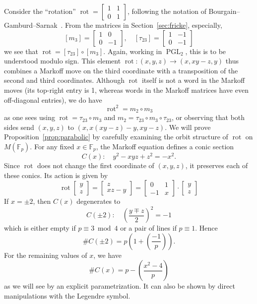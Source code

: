 \documentclass[10pt]{amsart}
\theoremstyle{definition}\newtheorem{defi}[theo]{Definition}\newtheorem{rema}[theo]{Remark}\newtheorem{exam}[theo]{Example}\newtheorem{exem}[theo]{Example}\newtheorem{nota}[theo]{Notation}
\newcommand{\F}{\mathbb{F}}
\DeclareMathOperator{\PGL}{PGL}
\DeclareMathOperator{\rot}{rot}
\newcommand{\legendre}[2]{\genfrac{(}{)}{}{}{#1}{#2}}
\begin{document}
Consider the ``rotation'' $\rot=
\left[\begin{smallmatrix}1 & 1\\
0 & 1
\end{smallmatrix}\right]$, following the notation of Bourgain--Gamburd--Sarnak~\cite[p.~3]{BGS}. From the matrices in Section~\ref{sec:fricke}, especially,
\[
[m_3] =
\begin{bmatrix} 1 & 0 \\ 0 & -1
\end{bmatrix},\quad[\tau_{23}] =
\begin{bmatrix} 1 & -1 \\ 0 & -1
\end{bmatrix}
\]
we see that $\rot = [\tau_{23}] \circ [m_3]$. Again, working in $\PGL_2$, this is to be understood modulo sign. This element $\rot:(x,y,z)\to(x,xy-z,y)$ thus combines a Markoff move on the third coordinate with a transposition of the second and third coordinates. Although $\rot$ itself is not a word in the Markoff moves (its top-right entry is 1, whereas words in the Markoff matrices have even off-diagonal entries), we do have
\begin{equation}\label{eqn:rot-square}
\rot^2 = m_2 \circ m_3
\end{equation}
as one sees using $\rot = \tau_{23} \circ m_3$ and $m_2 = \tau_{23} \circ m_3 \circ \tau_{23}$, or observing that both sides send $(x,y,z)$ to $(x, x(xy-z)-y, xy-z)$. We will prove Proposition~\ref{prop:parabolic} by carefully examining the orbit structure of $\rot$ on $M(\F_{p})$. For any fixed $x \in \F_p$, the Markoff equation defines a conic section
\begin{equation}
C(x): \quad y^2 - xyz + z^2 = -x^2.
\end{equation}
Since $\rot$ does not change the first coordinate of $(x,y,z)$, it preserves each of these conics. Its action is given by
\begin{equation}
\rot
\begin{bmatrix} y \\ z
\end{bmatrix} =
\begin{bmatrix} z \\ xz - y
\end{bmatrix} =
\begin{bmatrix} 0 & 1 \\ -1 & x
\end{bmatrix} \cdot
\begin{bmatrix} y \\ z
\end{bmatrix}
\end{equation}
If $x = \pm 2$, then $C(x)$ degenerates to
\[
C(\pm 2): \quad \left(\frac{y \mp z}{2} \right)^2 = - 1
\]
which is either empty if $p \equiv 3 \bmod 4$ or a pair of lines if $p \equiv 1$. Hence
\[
\# C(\pm 2) = p \left(1 + \legendre{-1}{p} \right).
\]
For the remaining values of $x$, we have
\[
\# C(x) = p - \legendre{x^2-4}{p}
\]
as we will see by an explicit parametrization. It can also be shown by direct manipulations with the Legendre symbol.
\end{document}
